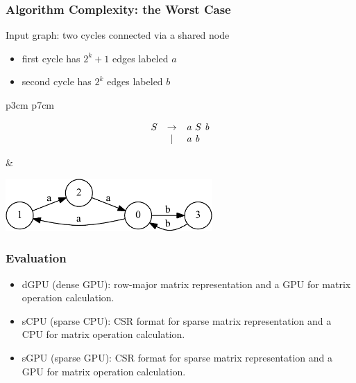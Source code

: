 \documentclass[xcolor=table]{beamer}
\begin{document}
\begin{frame}[fragile]
  \transwipe[direction=90]
  \frametitle{Algorithm Complexity: the Worst Case}



Input graph: two cycles connected via a shared node

\begin{itemize}
	\item first cycle has $2^k + 1$ edges labeled $a$
	\item second cycle has $2^k$ edges labeled $b$
\end{itemize}


  \begin{tabular}{p{3cm} p{7cm} }
\begin{figure}[h]
	\[
	\begin{array}{ccl}
	S & \rightarrow & \text{\emph{a}} \ S \ \text{\emph{b}} \\
	  & |           & \text{\emph{a}} \ \text{\emph{b}} \\ 
	\end{array}
	\]
	
\end{figure}

& 

\begin{center}
  \includegraphics[height=2cm]{pictures/example_graph.pdf}
\end{center}
  \end{tabular}

\end{frame}       
       
            
\begin{frame}
  \transwipe[direction=90]
  \frametitle{Evaluation}

\begin{itemize}
    \item dGPU (dense GPU): row-major matrix representation and a GPU for matrix operation calculation. 
    \item sCPU (sparse CPU): CSR format for sparse matrix representation and a CPU for matrix operation calculation. 
    \item sGPU (sparse GPU): CSR format for sparse matrix representation and a GPU for matrix operation calculation.
\end{itemize}


\end{frame}
       
\end{document}
